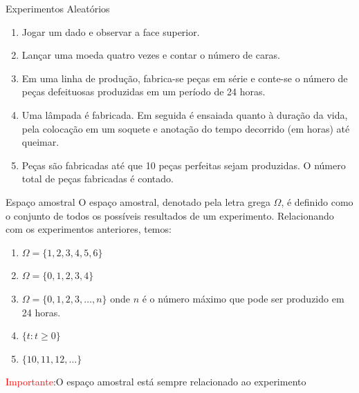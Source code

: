 \begin{frame}{Experimentos Aleatórios}

\begin{exemplo}
    \begin{enumerate}
        \item Jogar um dado e observar a face superior.
        \item Lançar uma moeda quatro vezes e contar o número de caras.
        \item Em uma linha de produção, fabrica-se peças em série e conte-se o número de peças defeituosas produzidas em um período de 24 horas.
        \item Uma lâmpada é fabricada. Em seguida é ensaiada quanto à duração da vida, pela colocação em um soquete e anotação do tempo decorrido (em horas) até queimar.
        \item Peças são fabricadas até que 10 peças perfeitas sejam produzidas. O número total de peças fabricadas é contado.
    \end{enumerate}
\end{exemplo}
\end{frame}

\begin{frame}{Espaço amostral}
    O espaço amostral, denotado pela letra grega $\Omega$, é definido como o conjunto de todos os possíveis resultados de um experimento. Relacionando com os experimentos anteriores, temos:
    \begin{exemplo}
        \begin{enumerate}
            \item $\Omega =\{1, 2, 3, 4, 5, 6\}$
            \item  $\Omega =\{0, 1, 2, 3, 4\}$
            \item $\Omega =\{0, 1, 2, 3 , \dots, n\}$ onde $n$ é o número máximo que pode ser produzido em 24 horas.
            \item $\{t : t \geq 0\}$
            \item $\{10, 11, 12, \dots\}$
        \end{enumerate}
    \end{exemplo}
\textcolor{red}{Importante}:O espaço amostral está sempre relacionado ao experimento
\end{frame}


